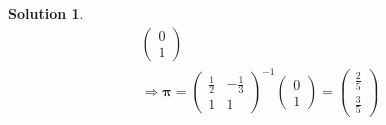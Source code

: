 \documentclass[a4paper, 10pt]{article}
\theoremstyle{definition}
\theoremstyle{hSol}
\newtheorem*{solution}{Solution}
\begin{document}
\begin{solution}
\begin{equation}
\begin{split}
\begin{pmatrix}
      0 \\[5pt]
      1
    \end{pmatrix} \\
    \Rightarrow 
    \bm{\pi} = \begin{pmatrix}
      \frac{1}{2} & -\frac{1}{3}\\[5pt]
      1 & 1
    \end{pmatrix}^{-1}
    \begin{pmatrix}
      0 \\[5pt]
      1
    \end{pmatrix} =
    \begin{pmatrix}
      \frac{2}{5} \\[5pt]
      \frac{3}{5}
    \end{pmatrix} 
  \end{split}
\end{equation}
\end{solution}
\end{document}
